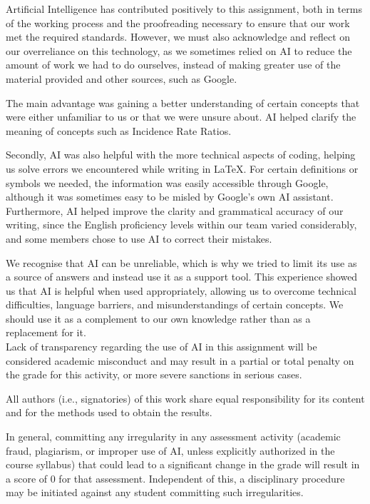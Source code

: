 \documentclass[10pt,a4paper,twoside]{article}\usepackage[]{graphicx}\usepackage[]{xcolor}
\begin{document}
Artificial Intelligence has contributed positively to this assignment, both in terms of the working process and the proofreading necessary to ensure that our work met the required standards. However, we must also acknowledge and reflect on our overreliance on this technology, as we sometimes relied on AI to reduce the amount of work we had to do ourselves, instead of making greater use of the material provided and other sources, such as Google.

The main advantage was gaining a better understanding of certain concepts that were either unfamiliar to us or that we were unsure about. AI helped clarify the meaning of concepts such as Incidence Rate Ratios.

Secondly, AI was also helpful with the more technical aspects of coding, helping us solve errors we encountered while writing in \LaTeX. For certain definitions or symbols we needed, the information was easily accessible through Google, although it was sometimes easy to be misled by Google's own AI assistant. Furthermore, AI helped improve the clarity and grammatical accuracy of our writing, since the English proficiency levels within our team varied considerably, and some members chose to use AI to correct their mistakes.

We recognise that AI can be unreliable, which is why we tried to limit its use as a source of answers and instead use it as a support tool. This experience showed us that AI is helpful when used appropriately, allowing us to overcome technical difficulties, language barriers, and misunderstandings of certain concepts. We should use it as a complement to our own knowledge rather than as a replacement for it.
\[
\]
Lack of transparency regarding the use of AI in this assignment will be considered academic misconduct and may result in a partial or total penalty on the grade for this activity, or more severe sanctions in serious cases.

All authors (i.e., signatories) of this work share equal responsibility for its content and for the methods used to obtain the results. 

In general, committing any irregularity in any assessment activity (academic fraud, plagiarism, or improper use of AI, unless explicitly authorized in the course syllabus) that could lead to a significant change in the grade will result in a score of 0 for that assessment. Independent of this, a disciplinary procedure may be initiated against any student committing such irregularities.
\end{document}
